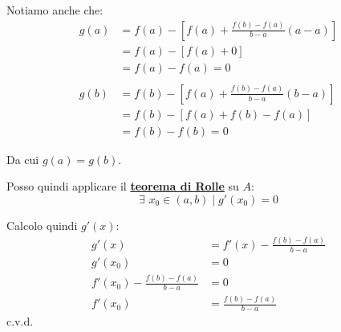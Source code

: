 \documentclass[../../dimostrazioni]{subfiles}
\begin{document}
            Notiamo anche che:
            \begin{align*}
                g(a) &= f(a) - \left[f(a) + \frac{f(b) - f(a)}{b - a}(a - a) \right]\\
                     &= f(a) - \left[f(a) + 0 \right]\\
                     &= f(a) - f(a) = 0\\
                     \\
                g(b) &= f(b) - \left[f(a) + \frac{f(b) - f(a)}{b - a}(b - a) \right]\\
                     &= f(b) - \left[f(a) + f(b) - f(a) \right]\\
                     &= f(b) - f(b) = 0
            \end{align*}
            
            Da cui \( g(a) = g(b) \).

            Posso quindi applicare il \textbf{\hyperref[teoRolle]{teorema di Rolle}} su \( A \):
            \[
                \exists \, \, x_0 \in (a,b) \; | \; g'(x_0) = 0
            \]
            
            Calcolo quindi \( g'(x) \):
            \begin{align*}
                g'(x) &= f'(x) - \frac{f(b) - f(a)}{b-a}\\
                g'(x_0) &= 0 \\
                f'(x_0) - \frac{f(b) - f(a)}{b-a} &= 0\\
                f'(x_0) &= \frac{f(b) - f(a)}{b-a}
            \end{align*} c.v.d.
            
    
\end{document}
